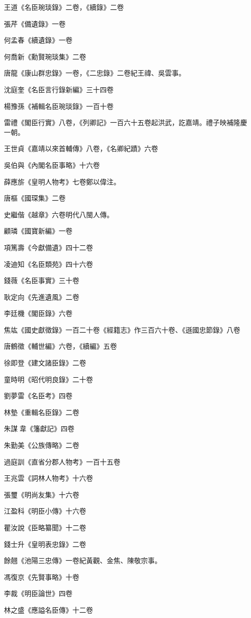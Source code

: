 王道《名臣琬琰錄》二卷，《續錄》二卷

張芹《備遺錄》一卷

何孟春《續遺錄》一卷

何喬新《勳賢琬琰集》二卷

唐龍《康山群忠錄》一卷，《二忠錄》二卷紀王禕、吳雲事。

沈庭奎《名臣言行錄新編》三十四卷

楊豫孫《補輯名臣琬琰錄》一百十卷

雷禮《閣臣行實》八卷，《列卿記》一百六十五卷起洪武，訖嘉靖。禮子映補隆慶一朝。

王世貞《嘉靖以來首輔傳》八卷，《名卿紀蹟》六卷

吳伯與《內閣名臣事略》十六卷

薛應旂《皇明人物考》七卷鄭以偉注。

唐樞《國琛集》二卷

史繼偕《越章》六卷明代八閩人傳。

顧璘《國寶新編》一卷

項篤壽《今獻備遺》四十二卷

凌迪知《名臣類苑》四十六卷

錢薇《名臣事實》三十卷

耿定向《先進遺風》二卷

李廷機《閣臣錄》六卷

焦竑《國史獻徵錄》一百二十卷《經籍志》作三百六十卷、《遜國忠節錄》八卷

唐鶴徵《輔世編》六卷，《續編》五卷

徐即登《建文諸臣錄》二卷

童時明《昭代明良錄》二十卷

劉夢雷《名臣考》四卷

林墊《重輯名臣錄》二卷

朱謀韋《籓獻記》四卷

朱勤美《公族傳略》二卷

過庭訓《直省分郡人物考》一百十五卷

王兆雲《詞林人物考》十六卷

張璽《明尚友集》十六卷

江盈科《明臣小傳》十六卷

瞿汝說《臣略纂聞》十二卷

錢士升《皇明表忠錄》二卷

餘翹《池陽三忠傳》一卷紀黃觀、金焦、陳敬宗事。

馮復京《先賢事略》十卷

李裁《明臣論世》四卷

林之盛《應謚名臣傳》十二卷

